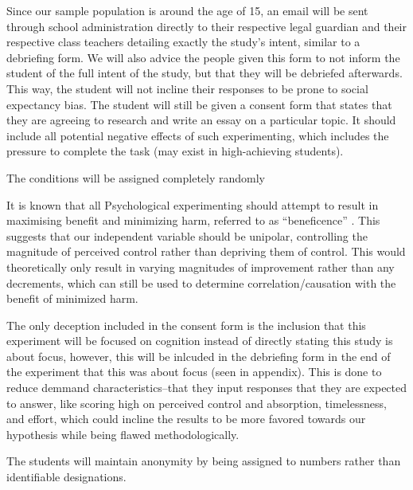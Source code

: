 \documentclass{article}
\begin{document}
Since our sample population is around the age of 15, an email will be sent through school administration directly to their respective legal guardian and their respective class teachers detailing exactly the study's intent, similar to a debriefing form. We will also advice the people given this form to not inform the student of the full intent of the study, but that they will be debriefed afterwards. This way, the student will not incline their responses to be prone to social expectancy bias. The student will still be given a consent form that states that they are agreeing to research and write an essay on a particular topic. It should include all potential negative effects of such experimenting, which includes the pressure to complete the task (may exist in high-achieving students).

The conditions will be assigned completely randomly %

It is known that all Psychological experimenting should attempt to result in maximising benefit and minimizing harm, referred to as ``beneficence'' \parencite{Belmont1979}. This suggests that our independent variable should be unipolar, controlling the magnitude of perceived control rather than depriving them of control. This would theoretically only result in varying magnitudes of improvement rather than any decrements, which can still be used to determine correlation/causation with the benefit of minimized harm. 

The only deception included in the consent form is the inclusion that this experiment will be focused on cognition instead of directly stating this study is about focus, however, this will be inlcuded in the debriefing form in the end of the experiment that this was about focus (seen in appendix). This is done to reduce demmand characteristics--that they input responses that they are expected to answer, like scoring high on perceived control and absorption, timelessness, and effort, which could incline the results to be more favored towards our hypothesis while being flawed methodologically.

The students will maintain anonymity by being assigned to numbers rather than identifiable designations.

%
\end{document}
